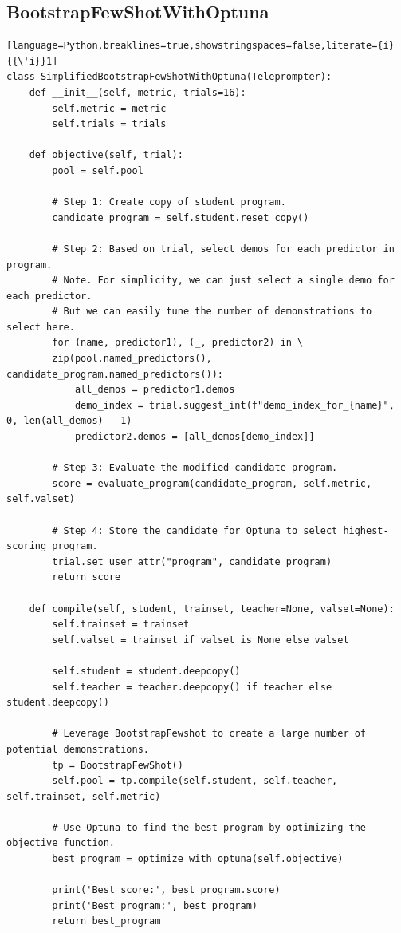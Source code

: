 \subsection{BootstrapFewShotWithOptuna}\label{code:BootstrapFewShotWithOptuna}
\begin{lstlisting}[language=Python,breaklines=true,showstringspaces=false,literate={í}{{\'i}}1]
class SimplifiedBootstrapFewShotWithOptuna(Teleprompter):
    def __init__(self, metric, trials=16):
        self.metric = metric
        self.trials = trials

    def objective(self, trial):
        pool = self.pool

        # Step 1: Create copy of student program.
        candidate_program = self.student.reset_copy()

        # Step 2: Based on trial, select demos for each predictor in program.
        # Note. For simplicity, we can just select a single demo for each predictor.
        # But we can easily tune the number of demonstrations to select here.
        for (name, predictor1), (_, predictor2) in \
        zip(pool.named_predictors(), candidate_program.named_predictors()):
            all_demos = predictor1.demos
            demo_index = trial.suggest_int(f"demo_index_for_{name}", 0, len(all_demos) - 1)
            predictor2.demos = [all_demos[demo_index]]

        # Step 3: Evaluate the modified candidate program.
        score = evaluate_program(candidate_program, self.metric, self.valset)

        # Step 4: Store the candidate for Optuna to select highest-scoring program.
        trial.set_user_attr("program", candidate_program)
        return score

    def compile(self, student, trainset, teacher=None, valset=None):
        self.trainset = trainset
        self.valset = trainset if valset is None else valset
         
        self.student = student.deepcopy()
        self.teacher = teacher.deepcopy() if teacher else student.deepcopy()

        # Leverage BootstrapFewshot to create a large number of potential demonstrations.
        tp = BootstrapFewShot()
        self.pool = tp.compile(self.student, self.teacher, self.trainset, self.metric)

        # Use Optuna to find the best program by optimizing the objective function.
        best_program = optimize_with_optuna(self.objective)

        print('Best score:', best_program.score)
        print('Best program:', best_program)
        return best_program
\end{lstlisting}


